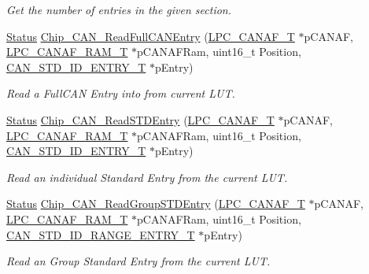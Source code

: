\begin{DoxyCompactItemize}
\begin{DoxyCompactList}\small\item\em Get the number of entries in the given section. \end{DoxyCompactList}\item 
\hyperlink{group__LPC__Types__Public__Types_ga67a0db04d321a74b7e7fcfd3f1a3f70b}{Status} \hyperlink{group__CAN__17XX__40XX_gac54b6ced8b370416a071912bd08a0091}{Chip\-\_\-\-C\-A\-N\-\_\-\-Read\-Full\-C\-A\-N\-Entry} (\hyperlink{structLPC__CANAF__T}{L\-P\-C\-\_\-\-C\-A\-N\-A\-F\-\_\-\-T} $\ast$p\-C\-A\-N\-A\-F, \hyperlink{structLPC__CANAF__RAM__T}{L\-P\-C\-\_\-\-C\-A\-N\-A\-F\-\_\-\-R\-A\-M\-\_\-\-T} $\ast$p\-C\-A\-N\-A\-F\-Ram, uint16\-\_\-t Position, \hyperlink{structCAN__STD__ID__ENTRY__T}{C\-A\-N\-\_\-\-S\-T\-D\-\_\-\-I\-D\-\_\-\-E\-N\-T\-R\-Y\-\_\-\-T} $\ast$p\-Entry)
\begin{DoxyCompactList}\small\item\em Read a Full\-C\-A\-N Entry into from current L\-U\-T. \end{DoxyCompactList}\item 
\hyperlink{group__LPC__Types__Public__Types_ga67a0db04d321a74b7e7fcfd3f1a3f70b}{Status} \hyperlink{group__CAN__17XX__40XX_ga0594319bfc5d033b7500a4ca706dc11a}{Chip\-\_\-\-C\-A\-N\-\_\-\-Read\-S\-T\-D\-Entry} (\hyperlink{structLPC__CANAF__T}{L\-P\-C\-\_\-\-C\-A\-N\-A\-F\-\_\-\-T} $\ast$p\-C\-A\-N\-A\-F, \hyperlink{structLPC__CANAF__RAM__T}{L\-P\-C\-\_\-\-C\-A\-N\-A\-F\-\_\-\-R\-A\-M\-\_\-\-T} $\ast$p\-C\-A\-N\-A\-F\-Ram, uint16\-\_\-t Position, \hyperlink{structCAN__STD__ID__ENTRY__T}{C\-A\-N\-\_\-\-S\-T\-D\-\_\-\-I\-D\-\_\-\-E\-N\-T\-R\-Y\-\_\-\-T} $\ast$p\-Entry)
\begin{DoxyCompactList}\small\item\em Read an individual Standard Entry from the current L\-U\-T. \end{DoxyCompactList}\item 
\hyperlink{group__LPC__Types__Public__Types_ga67a0db04d321a74b7e7fcfd3f1a3f70b}{Status} \hyperlink{group__CAN__17XX__40XX_ga1d8da3b3270e092f42dbe9e61f025b06}{Chip\-\_\-\-C\-A\-N\-\_\-\-Read\-Group\-S\-T\-D\-Entry} (\hyperlink{structLPC__CANAF__T}{L\-P\-C\-\_\-\-C\-A\-N\-A\-F\-\_\-\-T} $\ast$p\-C\-A\-N\-A\-F, \hyperlink{structLPC__CANAF__RAM__T}{L\-P\-C\-\_\-\-C\-A\-N\-A\-F\-\_\-\-R\-A\-M\-\_\-\-T} $\ast$p\-C\-A\-N\-A\-F\-Ram, uint16\-\_\-t Position, \hyperlink{structCAN__STD__ID__RANGE__ENTRY__T}{C\-A\-N\-\_\-\-S\-T\-D\-\_\-\-I\-D\-\_\-\-R\-A\-N\-G\-E\-\_\-\-E\-N\-T\-R\-Y\-\_\-\-T} $\ast$p\-Entry)
\begin{DoxyCompactList}\small\item\em Read an Group Standard Entry from the current L\-U\-T. \end{DoxyCompactList}\item 

\end{DoxyCompactItemize}
